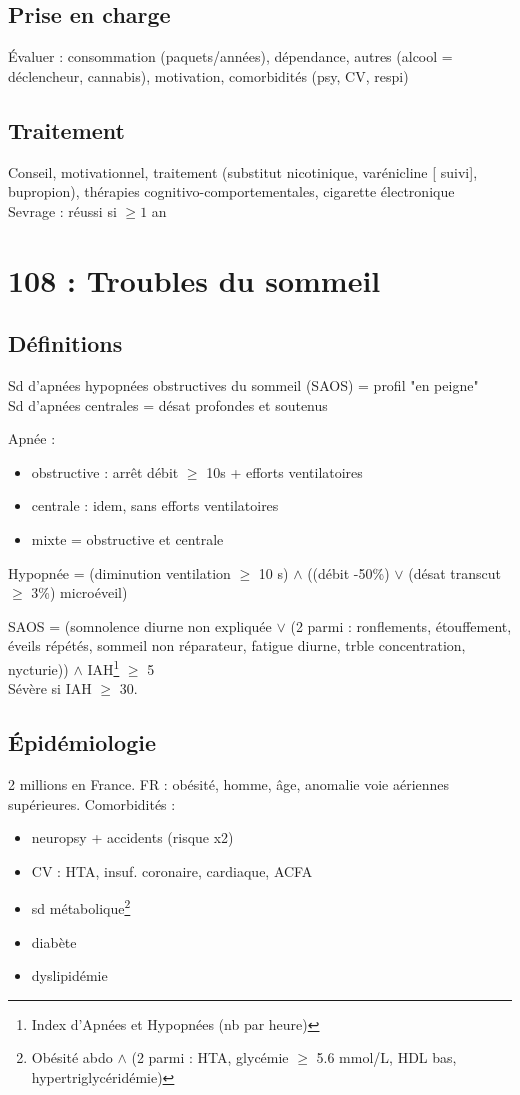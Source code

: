 \documentclass{article}
\begin{document}
\subsection{Prise en charge}
Évaluer : consommation (paquets/années), dépendance, autres (alcool = déclencheur,
cannabis), motivation, comorbidités (psy, CV, respi)
\subsection{Traitement}
Conseil, motivationnel, traitement (substitut nicotinique, varénicline [\danger
suivi], bupropion), thérapies cognitivo-comportementales, cigarette
électronique\\
Sevrage : réussi si \(\ge 1\) an


\section{108 : Troubles du sommeil}
\subsection{Définitions}
\danger Sd d'apnées hypopnées obstructives du sommeil (SAOS) = profil "en peigne"\\
Sd d'apnées centrales = désat profondes et soutenus

Apnée : 
\begin{itemize}
\item obstructive : arrêt débit \(\ge\) 10s + efforts ventilatoires
\item centrale : idem, sans efforts ventilatoires
\item mixte = obstructive et centrale
\end{itemize}
Hypopnée = (diminution ventilation \(\ge\) 10 s) \(\wedge\) ((débit -50\%) \(\vee\) (désat
transcut \(\ge\) 3\%) \textpm{} microéveil)

SAOS = (somnolence diurne non expliquée \(\vee\) (2 parmi : ronflements, étouffement,
éveils répétés, sommeil non réparateur, fatigue diurne, trble concentration,
nycturie)) \(\wedge{}\)  IAH\footnote{Index d'Apnées et Hypopnées (nb par heure)} \(\ge\) 5\\
Sévère si IAH \(\ge\) 30.
\subsection{Épidémiologie}
2 millions en France.
FR : obésité, homme, âge, anomalie voie aériennes supérieures. 
Comorbidités :
\begin{itemize}
\item neuropsy + accidents (risque x2)
\item CV : HTA, insuf. coronaire, cardiaque, ACFA
\item sd métabolique\footnote{Obésité abdo \(\wedge\) (2 parmi : HTA, glycémie \(\ge\) 5.6 mmol/L,
    HDL bas, hypertriglycéridémie)}
\item diabète
\item dyslipidémie
\end{itemize}
\end{document}
